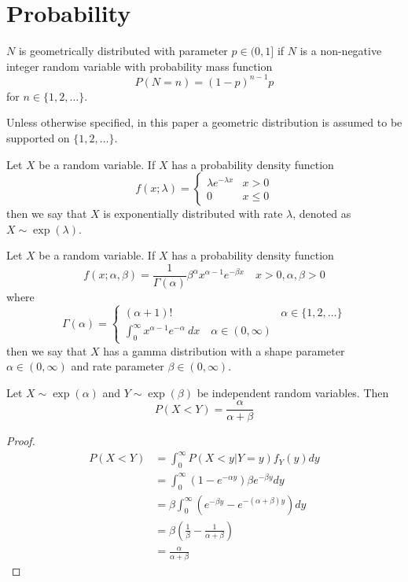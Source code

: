 \section{Probability}

\begin{defn}
$N$ is geometrically distributed with parameter $p \in (0,1]$ if $N$ is a non-negative integer random variable with probability mass function
$$
P(N = n) = (1 - p)^{n - 1} p
$$
for $n \in \{1,2,\ldots\}$.

Unless otherwise specified, in this paper a geometric distribution is assumed to be supported on $\{1,2,\ldots\}$.
\end{defn}

\begin{defn}
Let $X$ be a random variable.
If $X$ has a probability density function
$$
f(x; \lambda) = \begin{cases}
    \lambda e^{-\lambda x} & x > 0\\
    0 & x \leq 0
    \end{cases}
$$
then we say that $X$ is exponentially distributed with rate $\lambda$, denoted as $X \sim \exp(\lambda)$.
\end{defn}

\begin{defn}
Let $X$ be a random variable.
If $X$ has a probability density function
$$
f(x; \alpha, \beta) = \frac{1}{\Gamma(\alpha)} \beta^\alpha x^{\alpha - 1} e^{-\beta x} \quad x > 0, \alpha, \beta > 0
$$
where
$$
\Gamma(\alpha) = \begin{cases}
    (\alpha + 1) ! & \alpha \in \{1,2,\ldots\}\\
    \int_{0}^\infty x^{\alpha - 1} e^{-\alpha} ~dx \quad \alpha \in (0, \infty)
\end{cases}
$$
then we say that $X$ has a gamma distribution with a shape parameter $\alpha \in (0, \infty)$ and rate parameter $\beta \in (0, \infty)$.
\end{defn}

\begin{theorem}\label{thm:exp_x_less_y}
Let $X \sim \exp(\alpha)$ and $Y \sim \exp(\beta)$ be independent random variables.
Then
$$
P(X < Y) = \frac{\alpha}{\alpha + \beta}
$$
\end{theorem}

\begin{proof}
\begin{align*}
    P(X < Y) &= \int_0^\infty P(X < y | Y = y) f_Y(y) dy\\
    &= \int_0^\infty (1 - e^{-\alpha y}) \beta e^{-\beta y} dy\\
    &= \beta \int_0^\infty \left( e^{-\beta y} - e^{-(\alpha + \beta) y}\right) dy\\
    &= \beta \left(\frac{1}{\beta} - \frac{1}{\alpha + \beta}\right)\\
    &= \frac{\alpha}{\alpha + \beta}
\end{align*}
\end{proof}

